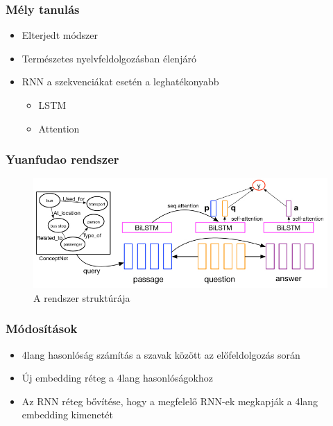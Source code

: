 \documentclass[bigger]{beamer}
\begin{document}

\begin{frame}
	\frametitle{M\'ely tanul\'as}
	\begin{itemize}
		\pause \item Elterjedt m\'odszer
		\pause \item Term\'eszetes nyelvfeldolgoz\'asban \'elenj\'ar\'o
		\pause \item RNN a szekvenci\'akat eset\'en a leghat\'ekonyabb
		\begin{itemize}
			\pause \item LSTM
			\pause \item Attention
		\end{itemize}
	\end{itemize}
\end{frame}


\begin{frame}
	\frametitle{Yuanfudao rendszer}
	\begin{figure}[h!]
		\centering
		\includegraphics[scale=0.4]{pics/TriAN.jpg}
		\caption{A rendszer strukt\'ur\'aja}
		\label{fig:dnn}
	\end{figure}
\end{frame}
\begin{frame}
	\frametitle{M\'odos\'it\'asok}
	\begin{itemize}
		\pause \item 4lang hasonl\'os\'ag sz\'am\'it\'as a szavak k\"oz\"ott az el\H{o}feldolgoz\'as sor\'an
		\pause \item \'Uj embedding r\'eteg a 4lang hasonl\'os\'agokhoz
		\pause \item Az RNN r\'eteg b\H{o}v\'it\'ese, hogy a megfelel\H{o} RNN-ek megkapj\'ak a 4lang embedding kimenet\'et
	\end{itemize}
\end{frame}


\end{document}
